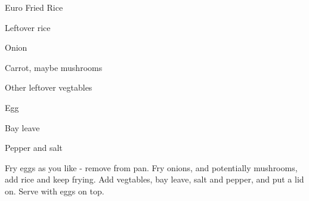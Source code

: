 \begin{recipe}{Euro Fried Rice}
    \begin{ingr}[1]
    \item Leftover rice
    \item Onion
    \item Carrot, maybe mushrooms
    \item Other leftover vegtables
    \item Egg
    \item Bay leave
    \item Pepper and salt
    \end{ingr}

    Fry eggs as you like - remove from pan. Fry onions, and
    potentially mushrooms,
    add rice and keep frying. Add vegtables, bay leave, salt and pepper,
    and put a lid on. Serve with eggs on top.
\end{recipe}
